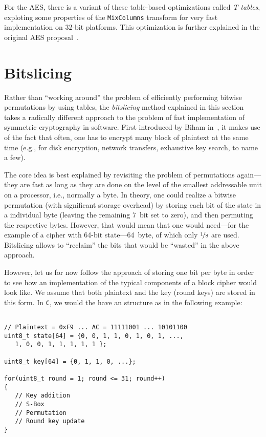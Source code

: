 For the \ac{AES}, there is a variant of these table-based optimizations called \emph{T tables}, exploting some properties of the \verb+MixColumns+ transform for very fast implementation on 32-bit platforms. This optimization is further explained in the original \ac{AES} proposal~\cite[Section 5.2]{Daemen99}.


\section{Bitslicing}
\label{sec:symmetric_crypto:bitslicing}
Rather than ``working around'' the problem of efficiently performing bitwise permutations by using tables, the \emph{bitslicing} method explained in this section takes a radically different approach to the problem of fast implementation of symmetric cryptography in software. First introduced by Biham in~\cite{Biham1997}, it makes use of the fact that often, one has to encrypt many block of plaintext at the same time (e.g., for disk encryption, network transfers, exhaustive key search, to name a few). 

The core idea is best explained by revisiting the problem of permutations again---they are fast as long as they are done on the level of the smallest addressable unit on a processor, i.e., normally a byte. In theory, one could realize a bitwise permutation (with significant storage overhead) by storing each bit of the state in a individual byte (leaving the remaining 7~bit set to zero), and then permuting the respective bytes. However, that would mean that one would need---for the example of a cipher with 64-bit state---64~byte, of which only $\nicefrac{1}{8}$ are used. Bitslicing allows to ``reclaim'' the bits that would be ``wasted'' in the above approach. 

However, let us for now follow the approach of storing one bit per byte in order to see how an implementation of the typical components of a block cipher would look like. We assume that both plaintext and the key (round keys) are stored in this form. In \verb+C+, we would the have an structure as in the following example:

\begin{lstlisting}

// Plaintext = 0xF9 ... AC = 11111001 ... 10101100
uint8_t state[64] = {0, 0, 1, 1, 0, 1, 0, 1, ..., 
   1, 0, 0, 1, 1, 1, 1, 1 };

uint8_t key[64] = {0, 1, 1, 0, ...};	

for(uint8_t round = 1; round <= 31; round++)
{
   // Key addition
   // S-Box
   // Permutation
   // Round key update
}
\end{lstlisting}

